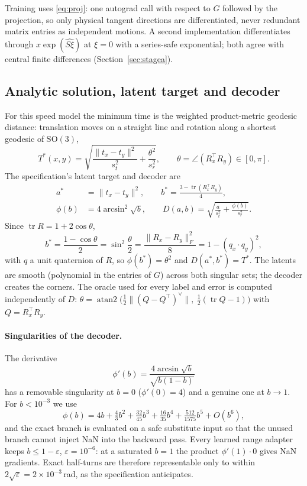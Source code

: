 \documentclass[11pt]{article}
\newcommand{\SO}{\mathrm{SO}(3)}
\newcommand{\vv}{^{\vee}}
\newcommand{\tr}{\operatorname{tr}}
\begin{document}
Training uses \eqref{eq:proj}: one autograd call with respect to $G$ followed by the projection, so
only physical tangent directions are differentiated, never redundant matrix entries as independent
motions. A second implementation differentiates through $x\exp(\widehat{S\xi})$ at $\xi=0$ with a
series-safe exponential; both agree with central finite differences (Section~\ref{sec:stagea}).

\subsection{Analytic solution, latent target and decoder}

For this speed model the minimum time is the weighted product-metric geodesic distance: translation
moves on a straight line and rotation along a shortest geodesic of $\SO$,
\begin{equation}
T^*(x,y)=\sqrt{\frac{\|t_x-t_y\|^2}{s_t^2}+\frac{\theta^2}{s_r^2}},\qquad
\theta=\angle(R_x^\top R_y)\in[0,\pi].
\end{equation}
The specification's latent target and decoder are
\begin{align}
a^*&=\|t_x-t_y\|^2,\qquad b^*=\frac{3-\tr(R_x^\top R_y)}{4},\\
\phi(b)&=4\arcsin^2\!\sqrt b,\qquad D(a,b)=\sqrt{\frac{a}{s_t^2}+\frac{\phi(b)}{s_r^2}}.
\end{align}
Since $\tr R=1+2\cos\theta$,
\begin{equation}
b^*=\frac{1-\cos\theta}{2}=\sin^2\frac{\theta}{2}=\frac{\|R_x-R_y\|_F^2}{8}=1-(q_x\cdot q_y)^2,
\label{eq:bstar}
\end{equation}
with $q$ a unit quaternion of $R$, so $\phi(b^*)=\theta^2$ and $D(a^*,b^*)=T^*$. The latents are smooth
(polynomial in the entries of $G$) across both singular sets; the decoder creates the corners.
The oracle used for every label and error is computed independently of $D$:
$\theta=\operatorname{atan2}\bigl(\tfrac12\|(Q-Q^\top)\vv\|,\ \tfrac12(\tr Q-1)\bigr)$ with $Q=R_x^\top R_y$.

\paragraph{Singularities of the decoder.} The derivative
\begin{equation}
\phi'(b)=\frac{4\arcsin\sqrt b}{\sqrt{b(1-b)}}
\end{equation}
has a removable singularity at $b=0$ ($\phi'(0)=4$) and a genuine one at $b\to1$. For $b<10^{-3}$ we
use
\begin{equation}
\phi(b)=4b+\tfrac43b^2+\tfrac{32}{45}b^3+\tfrac{16}{35}b^4+\tfrac{512}{1575}b^5+O(b^6),
\end{equation}
and the exact branch is evaluated on a safe substitute input so that the unused branch cannot inject
NaN into the backward pass. Every learned range adapter keeps $b\le1-\varepsilon$, $\varepsilon=10^{-6}$:
at a saturated $b=1$ the product $\phi'(1)\cdot0$ gives NaN gradients. Exact half-turns are therefore
representable only to within $2\sqrt\varepsilon=2\times10^{-3}$\,rad, as the specification anticipates.
\end{document}
